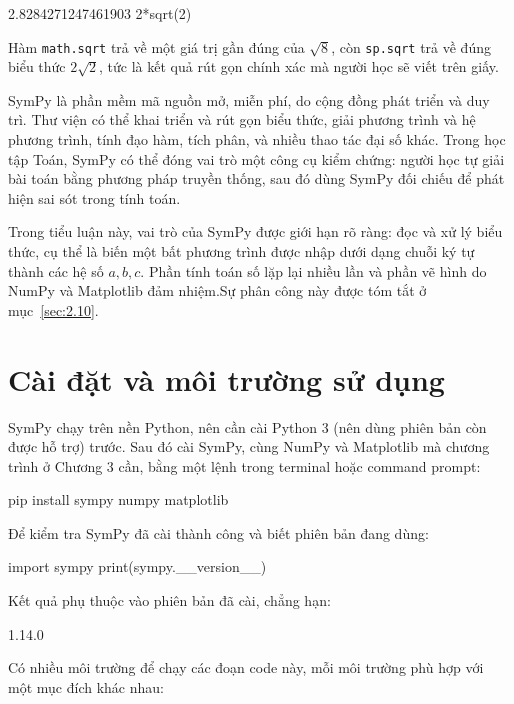 \documentclass[12pt,a4paper]{report}
\begin{document}
\begin{ketquabox}
2.8284271247461903
2*sqrt(2)
\end{ketquabox}

Hàm \texttt{math.sqrt} trả về một giá trị gần đúng của $\sqrt{8}$, còn \texttt{sp.sqrt} trả về đúng biểu thức $2\sqrt{2}$, tức là kết quả rút gọn chính xác mà người học sẽ viết trên giấy.

SymPy là phần mềm mã nguồn mở, miễn phí, do cộng đồng phát triển và duy trì. Thư viện có thể khai triển và rút gọn biểu thức, giải phương trình và hệ phương trình, tính đạo hàm, tích phân, và nhiều thao tác đại số khác. Trong học tập Toán, SymPy có thể đóng vai trò một công cụ kiểm chứng: người học tự giải bài toán bằng phương pháp truyền thống, sau đó dùng SymPy đối chiếu để phát hiện sai sót trong tính toán.

Trong tiểu luận này, vai trò của SymPy được giới hạn rõ ràng: đọc và xử lý biểu thức, cụ thể là biến một bất phương trình được nhập dưới dạng chuỗi ký tự thành các hệ số $a,b,c$. Phần tính toán số lặp lại nhiều lần và phần vẽ hình do NumPy và Matplotlib đảm nhiệm.Sự phân công này được tóm tắt ở mục~\ref{sec:2.10}.

\section{Cài đặt và môi trường sử dụng}
\label{sec:2.2}

SymPy chạy trên nền Python, nên cần cài Python 3 (nên dùng phiên bản còn được hỗ trợ) trước. Sau đó cài SymPy, cùng NumPy và Matplotlib mà chương trình ở Chương 3 cần, bằng một lệnh trong terminal hoặc command prompt:

\begin{madoanbox}
pip install sympy numpy matplotlib
\end{madoanbox}

Để kiểm tra SymPy đã cài thành công và biết phiên bản đang dùng:

\begin{madoanbox}
import sympy
print(sympy.__version__)
\end{madoanbox}

Kết quả phụ thuộc vào phiên bản đã cài, chẳng hạn:

\begin{ketquabox}
1.14.0
\end{ketquabox}

Có nhiều môi trường để chạy các đoạn code này, mỗi môi trường phù hợp với một mục đích khác nhau:
\end{document}
